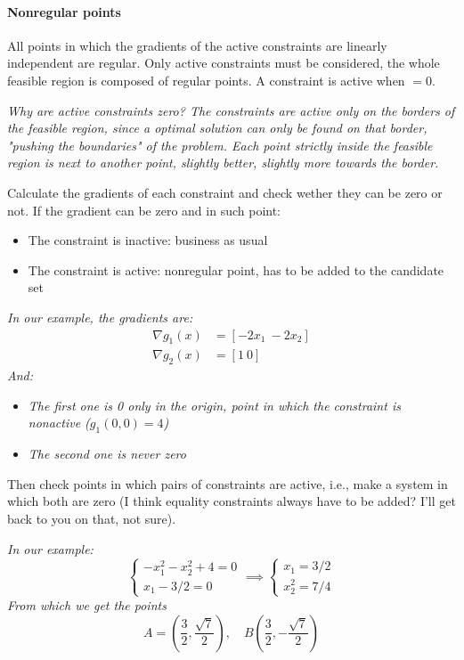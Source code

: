 \paragraph{Nonregular points} All points in which the gradients of the active constraints are linearly independent are regular. Only active constraints must be considered, the whole feasible region is composed of regular points. A constraint is active when $= 0$. 

\textit{Why are active constraints zero? The constraints are active only on the borders of the feasible region, since a optimal solution can only be found on that border, "pushing the boundaries" of the problem. Each point strictly inside the feasible region is next to another point, slightly better, slightly more towards the border.}

Calculate the gradients of each constraint and check wether they can be zero or not. If the gradient can be zero and in such point: 
\begin{itemize}
	\item The constraint is inactive: business as usual
	
	\item The constraint is active: nonregular point, has to be added to the candidate set
\end{itemize}

\textit{In our example, the gradients are: 
\begin{align*}
	\nabla g_1 (x) & = \left[ - 2 x_1 \  - 2 x_2 \right] \\
	\nabla g_2 (x) & = \left[ 1 \ 0 \right]
\end{align*}
And:}
\begin{itemize}
	\item \textit{The first one is 0 only in the origin, point in which the constraint is nonactive ($ g_1 (0,0) = 4 $)}
	
	\item \textit{The second one is never zero}
\end{itemize}

Then check points in which pairs of constraints are active, i.e., make a system in which both are zero (I think equality constraints always have to be added? I'll get back to you on that, not sure).

\textit{In our example:
$$
\begin{cases}
	-x_1^2 - x_2^2 + 4 = 0 \\
	x_1 - 3/2 = 0 
\end{cases}
\implies
\begin{cases}
	x_1 = 3/2 \\
	x_2^2 = 7/4
\end{cases}
$$
From which we get the points
$$ A = \left(\frac{3}{2}, \frac{\sqrt{7}}{2}\right), \quad B \left(\frac{3}{2}, - \frac{\sqrt{7}}{2}\right) $$}

